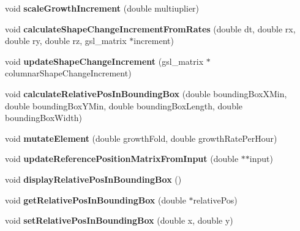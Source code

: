 \begin{DoxyCompactItemize}
\item 
\hypertarget{classShapeBase_a33c8d69e858be0ad6414f4f5f64eeb3b}{}void {\bfseries scale\+Growth\+Increment} (double multiuplier)\label{classShapeBase_a33c8d69e858be0ad6414f4f5f64eeb3b}

\item 
\hypertarget{classShapeBase_a2423a7dd85ab25b7eb38b5a954d732ab}{}void {\bfseries calculate\+Shape\+Change\+Increment\+From\+Rates} (double dt, double rx, double ry, double rz, gsl\+\_\+matrix $\ast$increment)\label{classShapeBase_a2423a7dd85ab25b7eb38b5a954d732ab}

\item 
\hypertarget{classShapeBase_ab057fa6a1189b6bed5ac9201fc6ca620}{}void {\bfseries update\+Shape\+Change\+Increment} (gsl\+\_\+matrix $\ast$columnar\+Shape\+Change\+Increment)\label{classShapeBase_ab057fa6a1189b6bed5ac9201fc6ca620}

\item 
\hypertarget{classShapeBase_a04278729ad9cc3238b1966ade0685a3d}{}void {\bfseries calculate\+Relative\+Pos\+In\+Bounding\+Box} (double bounding\+Box\+X\+Min, double bounding\+Box\+Y\+Min, double bounding\+Box\+Length, double bounding\+Box\+Width)\label{classShapeBase_a04278729ad9cc3238b1966ade0685a3d}

\item 
\hypertarget{classShapeBase_af39a584fa424f92b219d0ad903439ae7}{}void {\bfseries mutate\+Element} (double growth\+Fold, double growth\+Rate\+Per\+Hour)\label{classShapeBase_af39a584fa424f92b219d0ad903439ae7}

\item 
\hypertarget{classShapeBase_acf601cf9b007a1e001b01fb5ed84399a}{}void {\bfseries update\+Reference\+Position\+Matrix\+From\+Input} (double $\ast$$\ast$input)\label{classShapeBase_acf601cf9b007a1e001b01fb5ed84399a}

\item 
\hypertarget{classShapeBase_ae5e17514271f121498ed12cebae3aebe}{}void {\bfseries display\+Relative\+Pos\+In\+Bounding\+Box} ()\label{classShapeBase_ae5e17514271f121498ed12cebae3aebe}

\item 
\hypertarget{classShapeBase_a0d33afa938cd84b1376806a06769f6b9}{}void {\bfseries get\+Relative\+Pos\+In\+Bounding\+Box} (double $\ast$relative\+Pos)\label{classShapeBase_a0d33afa938cd84b1376806a06769f6b9}

\item 
\hypertarget{classShapeBase_a71d8a64fec5591d51c6d54ea76711e0d}{}void {\bfseries set\+Relative\+Pos\+In\+Bounding\+Box} (double x, double y)\label{classShapeBase_a71d8a64fec5591d51c6d54ea76711e0d}


\end{DoxyCompactItemize}
